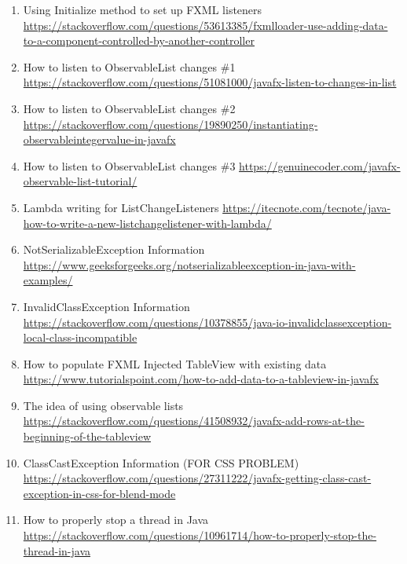 \begin{enumerate}
        \item Using Initialize method to set up FXML listeners \url{https://stackoverflow.com/questions/53613385/fxmlloader-use-adding-data-to-a-component-controlled-by-another-controller}
        
        \item How to listen to ObservableList changes \#1 \url{https://stackoverflow.com/questions/51081000/javafx-listen-to-changes-in-list}
        
        \item How to listen to ObservableList changes \#2 \url{https://stackoverflow.com/questions/19890250/instantiating-observableintegervalue-in-javafx}
        
        \item How to listen to ObservableList changes \#3 \url{https://genuinecoder.com/javafx-observable-list-tutorial/}
        
        \item Lambda writing for ListChangeListeners \url{https://itecnote.com/tecnote/java-how-to-write-a-new-listchangelistener-with-lambda/}
        
        \item NotSerializableException Information \url{https://www.geeksforgeeks.org/notserializableexception-in-java-with-examples/}
        
        \item InvalidClassException Information \url{https://stackoverflow.com/questions/10378855/java-io-invalidclassexception-local-class-incompatible}
        
        \item How to populate FXML Injected TableView with existing data \url{https://www.tutorialspoint.com/how-to-add-data-to-a-tableview-in-javafx}
        
        \item The idea of using observable lists \url{https://stackoverflow.com/questions/41508932/javafx-add-rows-at-the-beginning-of-the-tableview}
        
        \item ClassCastException Information (FOR CSS PROBLEM) \url{https://stackoverflow.com/questions/27311222/javafx-getting-class-cast-exception-in-css-for-blend-mode}
        
        \item How to properly stop a thread in Java \url{https://stackoverflow.com/questions/10961714/how-to-properly-stop-the-thread-in-java}
        

\end{enumerate}
